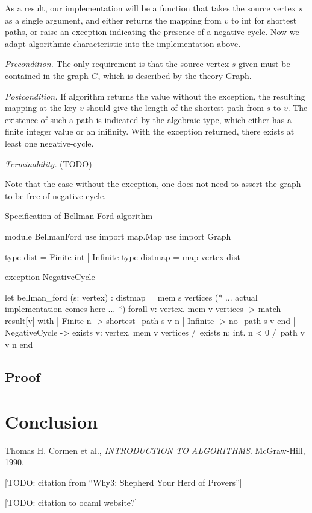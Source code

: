 \documentclass[a4paper,12pt]{article}
\begin{document}
As a result, our implementation will be a function that takes the source vertex $ s $ as a single argument, and either returns the mapping from $ v $ to \mbox{\sc int} for shortest paths, or raise an exception indicating the presence of a negative cycle. Now we adapt algorithmic characteristic into the implementation above.

\emph{Precondition.} The only requirement is that the source vertex $ s $ given must be contained in the graph $ G $, which is described by the theory \mbox{\sc Graph}.

\emph{Postcondition.} If algorithm returns the value without the exception, the resulting mapping at the key $ v $ should give the length of the shortest path from $ s $ to $ v $. The existence of such a path is indicated by the algebraic type, which either has a finite integer value or an inifinity. With the exception returned, there exists at least one negative-cycle.

\emph{Terminability.} (TODO)

Note that the case without the exception, one does not need to assert the graph to be free of negative-cycle.








\begin{algorithm}
\caption{Specification of Bellman-Ford algorithm}\label{lst:why_bf}
\begin{why3}[1]
module BellmanFord
  use import map.Map
  use import Graph

  type dist = Finite int | Infinite
  type distmap = map vertex dist

  exception NegativeCycle

  let bellman_ford (s: vertex) : distmap =
    { mem s vertices }
    (* ... actual implementation comes here ... *)
    { forall v: vertex. mem v vertices ->
        match result[v] with
        | Finite n -> shortest_path s v n
        | Infinite -> no_path s v
        end }
    | NegativeCycle ->
    { exists v: vertex. mem v vertices /\
      exists n: int. n < 0 /\ path v v n  }
end
\end{why3}
\end{algorithm}




\subsection{Proof}

\section{Conclusion}



\begin{thebibliography}{9}

  Thomas H. Cormen et al.,
  \emph{INTRODUCTION TO ALGORITHMS}.
  McGraw-Hill,
  1990.


[TODO: citation from ``Why3: Shepherd Your Herd of Provers'']

[TODO: citation to ocaml website?]


\end{thebibliography}
\end{document}
